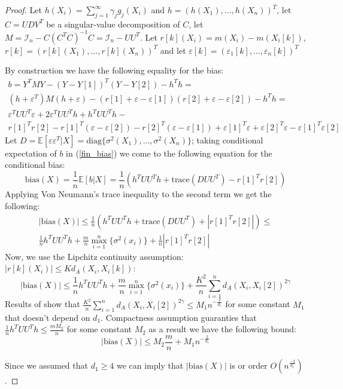 \documentclass[12pt]{article}
\theoremstyle{plain}
\begin{document}
\begin{proof}

Let $h(X_i) = \sum_{j=1}^{\infty}\gamma_jg_j(X_i)$ and $h = (h(X_1),\dots, h(X_n))^T$, let $C = UDV^T$ be a singular-value decomposition of $C$, let $M= \mathcal{I}_n-C(C^TC)^{-1}C = \mathcal{I}_n -UU^T$. Let $r[k](X_i) = m(X_i)-m(X_i[k])$, $r[k] = (r[k](X_1),\dots, r[k](X_n))^T$ and let $\varepsilon[k] = (\varepsilon_1[k],\dots, \varepsilon_n[k])^T$

By construction we have the following equality for the bias:
\begin{multline}\label{fin_bias}
b = Y^TMY -(Y-Y[1])^T(Y-Y[2]) -h^Th=\\
(h+ \varepsilon^T)M(h+\varepsilon) - (r[1]+\varepsilon -\varepsilon[1])(r[2]+\varepsilon - \varepsilon[2])-h^Th =\\
  \varepsilon^TUU^T\varepsilon+ 2\varepsilon^TUU^Th + h^TUU^Th -\\
  r[1]^Tr[2]-r[1]^T(\varepsilon-\varepsilon[2]) -r[2]^T(\varepsilon-\varepsilon[1])+\varepsilon[1]^T\varepsilon+\varepsilon[2]^T\varepsilon-\varepsilon[1]^T\varepsilon[2]
\end{multline}
Let $D = \mathbb{E}[\varepsilon \varepsilon^T|X]= \text{diag}\{\sigma^2(X_1),\dots, \sigma^2(X_n)\}$; taking conditional expectation of $b$ in (\ref{fin_bias}) we come to the following equation for the conditional bias:
\begin{equation}
\text{bias}(X)=\frac{1}{n}\mathbb{E}[b|X] =\frac1n\left( h^TUU^Th +\text{trace}(DUU^T)-r[1]^Tr[2]\right)
\end{equation}
Applying Von Neumann's trace inequality to the second term we get the following:
\begin{multline}
|\text{bias}(X)|\le  \frac1n\left(h^TUU^Th +\text{trace}(DUU^T)+|r[1]^Tr[2]|\right)\le\\
\frac1nh^TUU^Th+\frac mn\max_{i=1}^n\{\sigma^2(x_i)\} + \frac1n|r[1]^Tr[2]|
\end{multline}
Now, we use the Lipchitz continuity assumption: $|r[k](X_i)|\le K d_A(X_i,X_i[k])$:
\begin{equation}
|\text{bias}(X)|\le \frac1nh^TUU^Th+\frac mn\max_{i=1}^n\{\sigma^2(x_i)\} + \frac{K^2}{n}\sum_{i=1}^nd_A(X_i,X_i[2])^{2\gamma}
\end{equation}
Results of \parencite{liitiainen2008nonparametric} show that $\frac{K^2}{n}\sum_{i=1}^nd_A(X_i,X_i[2])^{2\gamma} \le M_1n^{-\frac{2}{d_1}}$ for some constant $M_1$ that doesn't depend on $d_1$. Compactness assumption guaranties that $ \frac1nh^TUU^Th\le \frac{m M_2}{n}$ for some constant $M_2$ as a result we have the following bound:
\begin{equation}
|\text{bias}(X)| \le M_2\frac{m}{n}+M_1n^{-\frac{2}{d_1}}
\end{equation}

Since we assumed that $d_1\ge 4$  we can imply that $|\text{bias}(X)|$ is or order $O\left(n^{\frac{-2}{d_1}}\right)$.
\end{proof}
\end{document}
